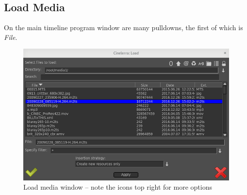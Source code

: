 \subsection{Load Media}%
\label{sub:load_media}

On the main timeline program window are many pulldowns, the first of which is \textit{File}.

\begin{figure}[htpb]
	\centering
	\includegraphics[width=1.0\linewidth]{images/load_files.png}
	\caption{Load media window -- note the icons top right for more options}	
\end{figure}

